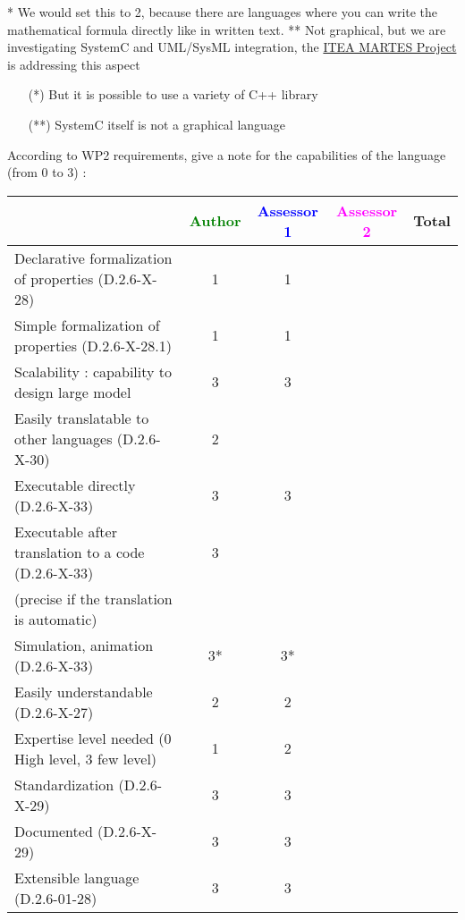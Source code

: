 \begin{author_comment}
* We would set this to 2, because there are languages where you can write the mathematical formula directly like in written text.
** Not graphical, but we are investigating SystemC and UML/SysML integration, the \href{http://www.martes-idea.org/}{ITEA MARTES Project} is addressing this aspect
\end{author_comment}
\begin{assessor1}
\begin{itemize}
\item[(*)] But it is possible to use a variety of C++ library
\item[(**)] SystemC itself is not a graphical language
\end{itemize}
\end{assessor1}

According to WP2 requirements, give a note for the capabilities of the language (from 0 to 3) :

\begin{tabular}{|l | c | c | c | c|}
\hline
& \textcolor{green}{Author} & \textcolor{blue}{Assessor 1} & \textcolor{magenta}{Assessor 2} & Total \\
\hline
Declarative formalization of properties (D.2.6-X-28) &1 &1 & & \\
\hline
Simple formalization of properties (D.2.6-X-28.1) &1 &1 & & \\
\hline
Scalability : capability to design large model &3 &3 & & \\
\hline
Easily translatable to other languages (D.2.6-X-30) & 2 &  & & \\
\hline
Executable directly (D.2.6-X-33) &3 & 3  & & \\
\hline
Executable after translation to a code (D.2.6-X-33) &3 & & & \\
(precise if the translation is automatic) & & & & \\
\hline
Simulation, animation (D.2.6-X-33) &3* &3* & & \\
\hline
Easily understandable (D.2.6-X-27) &2 &2 & & \\
\hline
Expertise level needed (0 High level, 3 few level) &1 &2 & & \\
\hline
Standardization (D.2.6-X-29) &3 &3 & & \\
\hline
Documented (D.2.6-X-29) &3 &3 & & \\
\hline
Extensible language (D.2.6-01-28) &3 &3 & & \\
\hline
\end{tabular}

